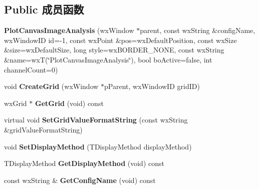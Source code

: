 \subsection*{Public 成员函数}
\begin{DoxyCompactItemize}
\item 
\hypertarget{class_plot_canvas_image_analysis_a96835d1670093c0592297681aae8545d}{{\bfseries Plot\+Canvas\+Image\+Analysis} (wx\+Window $\ast$parent, const wx\+String \&config\+Name, wx\+Window\+I\+D id=-\/1, const wx\+Point \&pos=wx\+Default\+Position, const wx\+Size \&size=wx\+Default\+Size, long style=wx\+B\+O\+R\+D\+E\+R\+\_\+\+N\+O\+N\+E, const wx\+String \&name=wx\+T(\char`\"{}Plot\+Canvas\+Image\+Analysis\char`\"{}), bool bo\+Active=false, int channel\+Count=0)}\label{class_plot_canvas_image_analysis_a96835d1670093c0592297681aae8545d}

\item 
\hypertarget{class_plot_canvas_image_analysis_a34022c488c879efb01763dc73d2d4500}{void {\bfseries Create\+Grid} (wx\+Window $\ast$p\+Parent, wx\+Window\+I\+D grid\+I\+D)}\label{class_plot_canvas_image_analysis_a34022c488c879efb01763dc73d2d4500}

\item 
\hypertarget{class_plot_canvas_image_analysis_a0de3ed8d8981bd654c5df73357f6934f}{wx\+Grid $\ast$ {\bfseries Get\+Grid} (void) const }\label{class_plot_canvas_image_analysis_a0de3ed8d8981bd654c5df73357f6934f}

\item 
\hypertarget{class_plot_canvas_image_analysis_aa960161e42c4db18e408512246e87fd7}{virtual void {\bfseries Set\+Grid\+Value\+Format\+String} (const wx\+String \&grid\+Value\+Format\+String)}\label{class_plot_canvas_image_analysis_aa960161e42c4db18e408512246e87fd7}

\item 
\hypertarget{class_plot_canvas_image_analysis_a89529da16294cca067b0d7376ae10e54}{void {\bfseries Set\+Display\+Method} (T\+Display\+Method display\+Method)}\label{class_plot_canvas_image_analysis_a89529da16294cca067b0d7376ae10e54}

\item 
\hypertarget{class_plot_canvas_image_analysis_a88cf1bc99c6c67d0dd50d830fa965d6b}{T\+Display\+Method {\bfseries Get\+Display\+Method} (void) const }\label{class_plot_canvas_image_analysis_a88cf1bc99c6c67d0dd50d830fa965d6b}

\item 
\hypertarget{class_plot_canvas_image_analysis_a736d1bb4c05c15599dc9e91739abb14f}{const wx\+String \& {\bfseries Get\+Config\+Name} (void) const }\label{class_plot_canvas_image_analysis_a736d1bb4c05c15599dc9e91739abb14f}


\end{DoxyCompactItemize}
